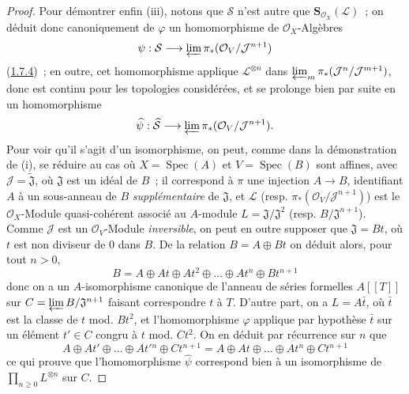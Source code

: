 \begin{proof}
Pour démontrer enfin (iii), notons que $\mathcal{S}$ n'est autre que
$\mathbf{S}_{\mathcal{O}_X}(\mathcal{L})$~; on déduit donc canoniquement de
$\varphi$ un homomorphisme de $\mathcal{O}_X$-Algèbres
\[
  \psi:\mathcal{S}\longrightarrow
  \varprojlim\pi_*(\mathcal{O}_V/\mathcal{J}^{n+1})
\]
(\hyperref[II.1.7.4-fr]{1.7.4})~; en outre, cet homomorphisme applique
$\mathcal{L}^{\otimes n}$ dans
$\varprojlim_m\pi_*(\mathcal{J}^n/\mathcal{J}^{m+1})$, donc est continu pour
les topologies considérées, et se prolonge bien par suite en un homomorphisme
\[
  \widehat{\psi}:\widehat{\mathcal{S}}\longrightarrow
  \varprojlim\pi_*(\mathcal{O}_V/\mathcal{J}^{n+1}).
\]
Pour voir qu'il s'agit d'un isomorphisme, on peut, comme dans la démonstration
de (i), se réduire au cas où $X=\operatorname{Spec}(A)$ et
$V=\operatorname{Spec}(B)$ sont affines, avec
$\mathcal{J}=\widetilde{\mathfrak{J}}$, où $\mathfrak{J}$ est un idéal de
$B$~; il correspond à $\pi$ une injection $A\to B$, identifiant $A$ à un
sous-anneau de $B$ \emph{supplémentaire} de $\mathfrak{J}$, et $\mathcal{L}$ (resp.
$\pi_*(\mathcal{O}_V/\mathcal{J}^{n+1})$) est le $\mathcal{O}_X$-Module
quasi-cohérent associé au $A$-module $L=\mathfrak{J}/\mathfrak{J}^2$ (resp.
$B/\mathfrak{J}^{n+1}$). Comme $\mathcal{J}$ est un
$\mathcal{O}_V$-Module \emph{inversible}, on peut en outre supposer que
$\mathfrak{J}=Bt$, où $t$ est non diviseur de 0 dans $B$. De la relation
$B=A\oplus Bt$ on déduit alors, pour tout $n>0$,
\[
  B=A\oplus At\oplus At^2\oplus\ldots\oplus At^n\oplus Bt^{n+1}
\]
donc on a un $A$-isomorphisme canonique de l'anneau de séries formelles
$A[[T]]$ sur $C=\varprojlim B/\mathfrak{J}^{n+1}$ faisant correspondre $t$ à
$T$. D'autre part, on a $L=A\bar t$, où $\bar t$ est la classe de $t$
mod. $Bt^2$, et l'homomorphisme $\varphi$ applique par hypothèse $\bar t$ sur
un élément $t'\in C$ congru à $t$ mod. $Ct^2$. On en déduit par récurrence
sur $n$ que
\[
  A\oplus At'\oplus\ldots\oplus At'{}^n\oplus Ct^{n+1}
  =A\oplus At\oplus\ldots\oplus At^n\oplus Ct^{n+1}
\]
ce qui prouve que l'homomorphisme $\widehat{\psi}$ correspond bien à un
isomorphisme de $\prod_{n\geqslant0}L^{\otimes n}$ sur $C$.
\end{proof}

